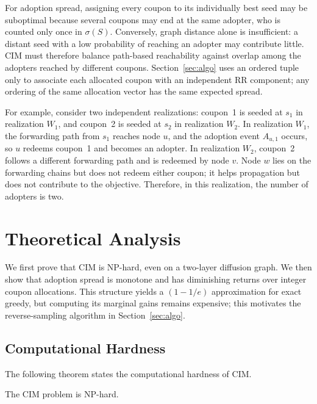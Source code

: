 \documentclass[sigconf,balance=false]{acmart}
\begin{document}
For adoption spread, assigning every coupon to its individually best seed may
be suboptimal because several coupons may end at the same adopter, who is
counted only once in $\sigma(S)$. Conversely, graph distance alone is
insufficient: a distant seed with a low probability of reaching an adopter may
contribute little. CIM must therefore balance path-based reachability against
overlap among the adopters reached by different coupons.
Section~\ref{sec:algo} uses an ordered tuple only to associate each
allocated coupon with an independent RR component; any ordering of the
same allocation vector has the same expected spread.

For example, consider two independent realizations: coupon~1 is
seeded at $s_1$ in realization $W_1$, and coupon~2 is seeded at $s_2$ in
realization $W_2$.
In realization $W_1$, the forwarding path from $s_1$ reaches node $u$, and
the adoption event $A_{u,1}$ occurs, so $u$ redeems coupon~1 and becomes an
adopter.
In realization $W_2$, coupon~2 follows a different forwarding path and
is redeemed by node $v$.
Node $w$ lies on the forwarding chains but does not redeem either coupon; it
helps propagation but does not contribute to the objective.
Therefore, in this realization, the number of adopters is two.

\section{Theoretical Analysis}
\label{sec:theory}

We first prove that CIM is NP-hard, even on a two-layer diffusion graph.
We then show that adoption spread is monotone and has diminishing returns
over integer coupon allocations.
This structure yields a $(1-1/e)$ approximation for exact greedy, but
computing its marginal gains remains expensive; this motivates the
reverse-sampling algorithm in Section~\ref{sec:algo}.

\subsection{Computational Hardness}

The following theorem states the computational hardness of CIM.

\begin{theorem}
\label{thm:nphard}
The CIM problem is NP-hard.
\end{theorem}
\end{document}
